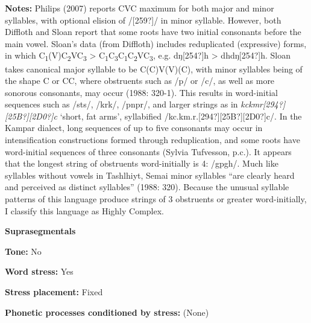 \begin{styleBody}
\textbf{Notes: }Philips (2007) reports CVC maximum for both major and minor syllables, with optional elision of /[259?]/ in minor syllable. However, both Diffloth and Sloan report that some roots have two initial consonants before the main vowel. Sloan’s data (from Diffloth) includes reduplicated (expressive) forms, in which C\textsubscript{1}(V)C\textsubscript{2}VC\textsubscript{3} {\textgreater} C\textsubscript{1}C\textsubscript{3}C\textsubscript{1}C\textsubscript{2}VC\textsubscript{3}, e.g. dŋ[254?]h {\textgreater} dhdŋ[254?]h. Sloan takes canonical major syllable to be C(C)V(V)(C), with minor syllables being of the shape C or CC, where obstruents such as /p/ or /c/, as well as more sonorous consonants, may occur (1988: 320-1). This results in word-initial sequences such as /sts/, /krk/, /pnpr/, and larger strings as in \textit{kckmr[294?][25B?][2D0?]c} ‘short, fat arms’, syllabified /kc.km.r.[294?][25B?][2D0?]c/. In the Kampar dialect, long sequences of up to five consonants may occur in intensification constructions formed through reduplication, and some roots have word-initial sequences of three consonants (Sylvia Tufvesson, p.c.). It appears that the longest string of obstruents word-initially is 4: /gpgh/. Much like syllables without vowels in Tashlhiyt, Semai minor syllables “are clearly heard and perceived as distinct syllables” (1988: 320). Because the unusual syllable patterns of this language produce strings of 3 obstruents or greater word-initially, I classify this language as Highly Complex.
\end{styleBody}

\begin{styleBody}
\textbf{Suprasegmentals}
\end{styleBody}

\begin{styleBody}
\textbf{Tone:} No
\end{styleBody}

\begin{styleBody}
\textbf{Word stress:} Yes
\end{styleBody}

\begin{styleBody}
\textbf{Stress placement:} Fixed
\end{styleBody}

\begin{styleBody}
\textbf{Phonetic processes conditioned by stress:} (None)
\end{styleBody}


